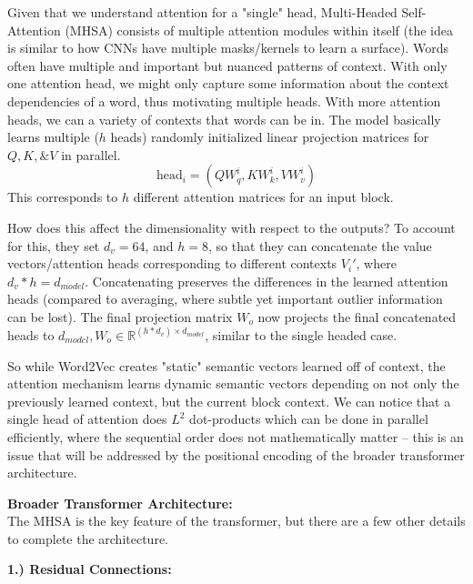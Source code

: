 \documentclass[11pt]{article}
\newcommand{\RR}{\mathbb{R}} %
\begin{document}
Given that we understand attention for a "single" head, Multi-Headed Self-Attention (MHSA) consists of multiple attention modules within itself (the idea is similar to how CNNs have multiple masks/kernels to learn a surface). Words often have multiple and important but nuanced patterns of context. With only one attention head, we might only capture some information about the context dependencies of a word, thus  motivating multiple heads. With more attention heads, we can a variety of contexts that words can be in. The model basically learns multiple ($h$ heads) randomly initialized linear projection matrices for $Q, K, \& V$ in parallel. $$\mbox{head}_i = (QW_q^i, KW_k^i, VW_v^i)$$
This corresponds to $h$ different attention matrices for an input block. 

How does this affect the dimensionality with respect to the outputs? To account for this, they set $d_v = 64$, and $h = 8$, so that they can concatenate the value vectors/attention heads corresponding to different contexts $V_i'$, where $d_v * h = d_{model}$. Concatenating preserves the differences in the learned attention heads (compared to averaging, where subtle yet important outlier information can be lost). The final projection matrix $W_o$ now projects the final concatenated heads to $d_{model}, W_o \in \RR^{(h*d_v) \times d_{model}}$, similar to the single headed case.

So while Word2Vec creates "static" semantic vectors learned off of context, the attention mechanism learns dynamic semantic vectors depending on not only the previously learned context, but the current block context. We can notice that a single head of attention does $L^2$ dot-products which can be done in parallel efficiently, where the sequential order does not mathematically matter -- this is an issue that will be addressed by the positional encoding of the broader transformer architecture.


\textbf{Broader Transformer Architecture:}\\

The MHSA is the key feature of the transformer, but there are a few other details to complete the architecture. 


\textbf{1.) Residual Connections:}\\
\end{document}
